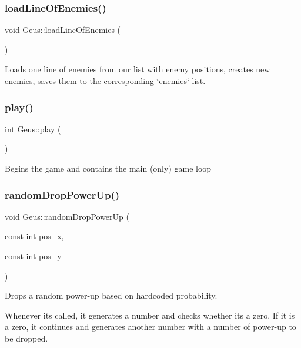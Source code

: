 \subsubsection{\texorpdfstring{load\+Line\+Of\+Enemies()}{loadLineOfEnemies()}}
{\footnotesize\ttfamily void Geus\+::load\+Line\+Of\+Enemies (\begin{DoxyParamCaption}{ }\end{DoxyParamCaption})\hspace{0.3cm}{\ttfamily [private]}}

Loads one line of enemies from our list with enemy positions, creates new enemies, saves them to the corresponding \char`\"{}enemies\char`\"{} list. \mbox{\label{classGeus_af62245e002ed29f52e4ffff6372f4da9}} 
\subsubsection{\texorpdfstring{play()}{play()}}
{\footnotesize\ttfamily int Geus\+::play (\begin{DoxyParamCaption}{ }\end{DoxyParamCaption})}

Begins the game and contains the main (only) game loop \mbox{\label{classGeus_a9543c5d421c0a5926bfb16d59bbcab12}} 
\subsubsection{\texorpdfstring{random\+Drop\+Power\+Up()}{randomDropPowerUp()}}
{\footnotesize\ttfamily void Geus\+::random\+Drop\+Power\+Up (\begin{DoxyParamCaption}\item[{const int}]{pos\+\_\+x,  }\item[{const int}]{pos\+\_\+y }\end{DoxyParamCaption})\hspace{0.3cm}{\ttfamily [private]}}



Drops a random power-\/up based on hardcoded probability. 

Whenever it\textquotesingle{}s called, it generates a number and checks whether it\textquotesingle{}s a zero. If it is a zero, it continues and generates another number with a number of power-\/up to be dropped.


